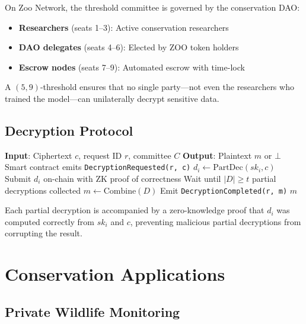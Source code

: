 \documentclass[11pt,letterpaper]{article}
\begin{document}
On Zoo Network, the threshold committee is governed by the conservation DAO:

\begin{itemize}
    \item \textbf{Researchers} (seats 1--3): Active conservation researchers
    \item \textbf{DAO delegates} (seats 4--6): Elected by ZOO token holders
    \item \textbf{Escrow nodes} (seats 7--9): Automated escrow with time-lock
\end{itemize}

A $(5, 9)$-threshold ensures that no single party---not even the researchers who trained the model---can unilaterally decrypt sensitive data.

\subsection{Decryption Protocol}

\begin{algorithm}[t]
\caption{Threshold Decryption on Zoo}
\label{alg:threshold}
\begin{algorithmic}[1]
\STATE \textbf{Input}: Ciphertext $c$, request ID $r$, committee $C$
\STATE \textbf{Output}: Plaintext $m$ or $\bot$
\STATE Smart contract emits \texttt{DecryptionRequested(r, c)}
    \STATE $d_i \leftarrow \text{PartDec}(sk_i, c)$
    \STATE Submit $d_i$ on-chain with ZK proof of correctness
\ENDFOR
\STATE Wait until $|D| \geq t$ partial decryptions collected
\STATE $m \leftarrow \text{Combine}(D)$
\STATE Emit \texttt{DecryptionCompleted(r, m)}
\RETURN $m$
\end{algorithmic}
\end{algorithm}

Each partial decryption is accompanied by a zero-knowledge proof that $d_i$ was computed correctly from $sk_i$ and $c$, preventing malicious partial decryptions from corrupting the result.

\section{Conservation Applications}
\label{sec:applications}

\subsection{Private Wildlife Monitoring}
\end{document}

